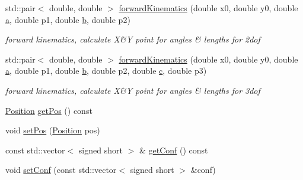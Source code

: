 \begin{DoxyCompactItemize}
std\+::pair$<$ double, double $>$ \hyperlink{class_robotic_arm_a549f24f349105a6b5130eb237d737132}{forward\+Kinematics} (double x0, double y0, double \hyperlink{class_robotic_arm_aaf0461b1cb35da93d2e446f50b9813a4}{a}, double p1, double \hyperlink{class_robotic_arm_a2758a63b85f492abda0e84f32fbfdd98}{b}, double p2)
\begin{DoxyCompactList}\small\item\em forward kinematics, calculate X\&Y point for angles \& lengths for 2dof \end{DoxyCompactList}\item 
std\+::pair$<$ double, double $>$ \hyperlink{class_robotic_arm_ade404a134912096fb363fa90ea0cd927}{forward\+Kinematics} (double x0, double y0, double \hyperlink{class_robotic_arm_aaf0461b1cb35da93d2e446f50b9813a4}{a}, double p1, double \hyperlink{class_robotic_arm_a2758a63b85f492abda0e84f32fbfdd98}{b}, double p2, double \hyperlink{class_robotic_arm_a5f6cae6b67db69c97b75970dacc72ea8}{c}, double p3)
\begin{DoxyCompactList}\small\item\em forward kinematics, calculate X\&Y point for angles \& lengths for 3dof \end{DoxyCompactList}\item 
\hyperlink{struct_position}{Position} \hyperlink{class_robotic_arm_a472bb97d5867b86add81326010da2f0f}{get\+Pos} () const 
\item 
void \hyperlink{class_robotic_arm_ad3f7fcafa4909fee1db198353434e987}{set\+Pos} (\hyperlink{struct_position}{Position} pos)
\item 
const std\+::vector$<$ signed short $>$ \& \hyperlink{class_robotic_arm_a18d2147e468f8026f301f1d96d040ea5}{get\+Conf} () const 
\item 
void \hyperlink{class_robotic_arm_ad69cfd597e6e397b88a316ef93b68ece}{set\+Conf} (const std\+::vector$<$ signed short $>$ \&conf)
\end{DoxyCompactItemize}
